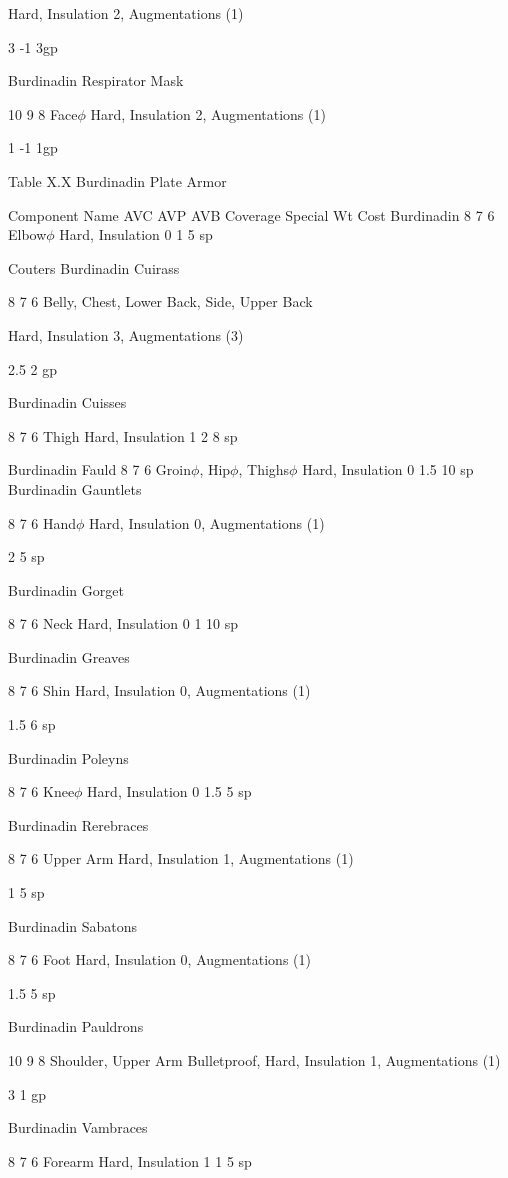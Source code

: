 \documentclass[oneside,11pt,english]{book}
\begin{document}
Hard, Insulation 2, 
Augmentations (1) 

3 -1 3gp 

Burdinadin 
Respirator Mask 

10 9 8 Face$\phi$ Hard, Insulation 2, 
Augmentations (1) 

1 -1 1gp 

 
Table X.X Burdinadin Plate Armor 

 

Component Name AVC AVP AVB Coverage Special Wt Cost 
Burdinadin 8 7 6 Elbow$\phi$ Hard, Insulation 0 1 5 sp 


Couters 
Burdinadin 
Cuirass 

8 7 6 Belly, Chest, Lower Back, 
Side, Upper Back 

Hard, Insulation 3, Augmentations 
(3) 

2.5 2 gp 

Burdinadin 
Cuisses 

8 7 6 Thigh Hard, Insulation 1 2 8 sp 

Burdinadin Fauld 8 7 6 Groin$\phi$, Hip$\phi$, Thighs$\phi$ Hard, Insulation 0 1.5 10 
sp 
Burdinadin 
Gauntlets 

8 7 6 Hand$\phi$ Hard, Insulation 0, Augmentations 
(1) 

2 5 sp 

Burdinadin 
Gorget 

8 7 6 Neck Hard, Insulation 0 1 10 
sp 

Burdinadin 
Greaves 

8 7 6 Shin Hard, Insulation 0, Augmentations 
(1) 

1.5 6 sp 

Burdinadin 
Poleyns 

8 7 6 Knee$\phi$ Hard, Insulation 0 1.5 5 sp 

Burdinadin 
Rerebraces 

8 7 6 Upper Arm Hard, Insulation 1, Augmentations 
(1) 

1 5 sp 

Burdinadin 
Sabatons 

8 7 6 Foot Hard, Insulation 0, Augmentations 
(1) 

1.5 5 sp 

Burdinadin 
Pauldrons 

10 9 8 Shoulder, Upper Arm Bulletproof, Hard, Insulation 1, 
Augmentations (1) 

3 1 gp 

Burdinadin 
Vambraces 

8 7 6 Forearm Hard, Insulation 1 1 5 sp 
\end{document}
